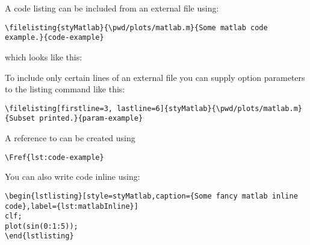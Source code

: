 
A code listing can be included from an external file using:

\begin{verbatim}
\filelisting{styMatlab}{\pwd/plots/matlab.m}{Some matlab code example.}{code-example}
\end{verbatim}

\noindent which looks like this:


\vspace{5mm}
\noindent To include only certain lines of an external file you can supply option parameters to the listing command like this:

\begin{verbatim}
\filelisting[firstline=3, lastline=6]{styMatlab}{\pwd/plots/matlab.m}{Subset printed.}{param-example}
\end{verbatim}

\vspace{5mm}
\noindent A reference to  can be created using

\begin{verbatim}
\Fref{lst:code-example}
\end{verbatim}

\vspace{5mm}
\noindent You can also write code inline using:

\begin{verbatim}
\begin{lstlisting}[style=styMatlab,caption={Some fancy matlab inline code},label={lst:matlabInline}]
clf;
plot(sin(0:1:5));
\end{lstlisting}
\end{verbatim}

